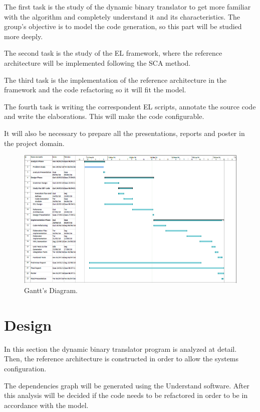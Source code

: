 \documentclass{report}
\begin{document}
	\par The first task is the study of the dynamic binary translator to get more familiar with the algorithm and completely understand it and its characteristics. The group's objective is to model the code generation, so this part will be studied more deeply.
	\par The second task is the study of the EL framework, where the reference architecture will be implemented following the SCA method.
	\par The third task is the implementation of the reference architecture in the framework and the code refactoring so it will fit the model. 
	\par The fourth task is writing the correspondent EL scripts, annotate the source code and write the elaborations. This will make the code configurable.
	\par It will also be necessary to prepare all the presentations, reports and poster in the project domain.
	
	\begin{figure} [H]
		\centering
		\includegraphics[width=1.1\linewidth]{Images/gantv2}
		\caption{Gantt's Diagram.}
		\label{fig:gantt}
	\end{figure}
	



\chapter{Design}

	\par In this section the dynamic binary translator program is analyzed at detail. Then, the reference architecture is constructed in order to allow the systems configuration. 
	\par The dependencies graph will be generated using the Understand software. After this analysis will be decided if the code needs to be refactored in order to be in accordance with the model. 
	
\end{document}
